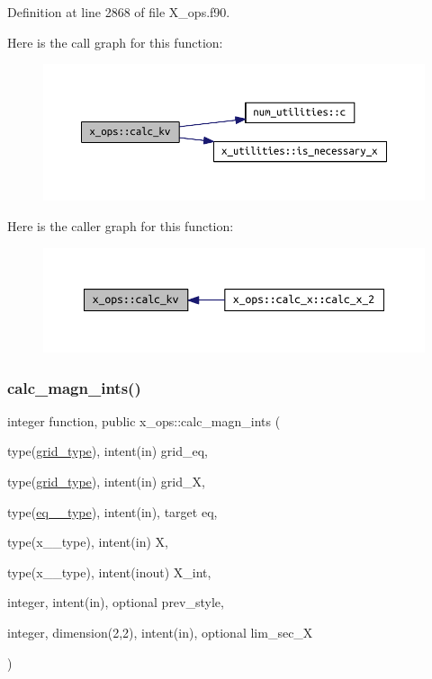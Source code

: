 Definition at line 2868 of file X\+\_\+ops.\+f90.

Here is the call graph for this function\+:\nopagebreak
\begin{figure}[H]
\begin{center}
\leavevmode
\includegraphics[width=350pt]{namespacex__ops_a045e8903230dfa0fb8b89b458d0c8ee2_cgraph}
\end{center}
\end{figure}
Here is the caller graph for this function\+:\nopagebreak
\begin{figure}[H]
\begin{center}
\leavevmode
\includegraphics[width=350pt]{namespacex__ops_a045e8903230dfa0fb8b89b458d0c8ee2_icgraph}
\end{center}
\end{figure}
\mbox{\label{namespacex__ops_a6df79622d1b95d54ab3e542751a5881d}} 
\subsubsection{\texorpdfstring{calc\+\_\+magn\+\_\+ints()}{calc\_magn\_ints()}}
{\footnotesize\ttfamily integer function, public x\+\_\+ops\+::calc\+\_\+magn\+\_\+ints (\begin{DoxyParamCaption}\item[{type(\hyperlink{structgrid__vars_1_1grid__type}{grid\+\_\+type}), intent(in)}]{grid\+\_\+eq,  }\item[{type(\hyperlink{structgrid__vars_1_1grid__type}{grid\+\_\+type}), intent(in)}]{grid\+\_\+X,  }\item[{type(\hyperlink{structeq__vars_1_1eq__2__type}{eq\+\_\+2\+\_\+type}), intent(in), target}]{eq,  }\item[{type(x\+\_\+2\+\_\+type), intent(in)}]{X,  }\item[{type(x\+\_\+2\+\_\+type), intent(inout)}]{X\+\_\+int,  }\item[{integer, intent(in), optional}]{prev\+\_\+style,  }\item[{integer, dimension(2,2), intent(in), optional}]{lim\+\_\+sec\+\_\+X }\end{DoxyParamCaption})}



